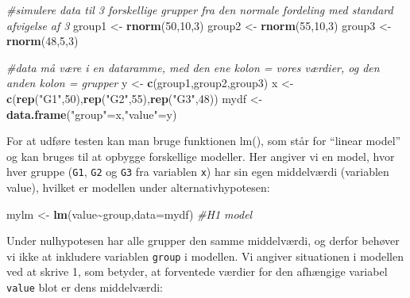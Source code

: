 \documentclass[
]{book}
\newenvironment{Shaded}{\begin{snugshade}}{\end{snugshade}}
\newcommand{\AttributeTok}[1]{\textcolor[rgb]{0.13,0.29,0.53}{#1}}
\newcommand{\CommentTok}[1]{\textcolor[rgb]{0.56,0.35,0.01}{\textit{#1}}}
\newcommand{\DecValTok}[1]{\textcolor[rgb]{0.00,0.00,0.81}{#1}}
\newcommand{\FunctionTok}[1]{\textcolor[rgb]{0.13,0.29,0.53}{\textbf{#1}}}
\newcommand{\NormalTok}[1]{#1}
\newcommand{\OtherTok}[1]{\textcolor[rgb]{0.56,0.35,0.01}{#1}}
\newcommand{\SpecialCharTok}[1]{\textcolor[rgb]{0.81,0.36,0.00}{\textbf{#1}}}
\newcommand{\StringTok}[1]{\textcolor[rgb]{0.31,0.60,0.02}{#1}}
\begin{document}
\begin{Shaded}
\begin{Highlighting}[]
\CommentTok{\#simulere data til 3 forskellige grupper fra den normale fordeling med standard afvigelse af 3}
\NormalTok{group1 }\OtherTok{\textless{}{-}} \FunctionTok{rnorm}\NormalTok{(}\DecValTok{50}\NormalTok{,}\DecValTok{10}\NormalTok{,}\DecValTok{3}\NormalTok{)}
\NormalTok{group2 }\OtherTok{\textless{}{-}} \FunctionTok{rnorm}\NormalTok{(}\DecValTok{55}\NormalTok{,}\DecValTok{10}\NormalTok{,}\DecValTok{3}\NormalTok{)}
\NormalTok{group3 }\OtherTok{\textless{}{-}} \FunctionTok{rnorm}\NormalTok{(}\DecValTok{48}\NormalTok{,}\DecValTok{5}\NormalTok{,}\DecValTok{3}\NormalTok{)}

\CommentTok{\#data må være i en dataramme, med den ene kolon = vores værdier, og den anden kolon = grupper}
\NormalTok{y }\OtherTok{\textless{}{-}} \FunctionTok{c}\NormalTok{(group1,group2,group3)}
\NormalTok{x }\OtherTok{\textless{}{-}} \FunctionTok{c}\NormalTok{(}\FunctionTok{rep}\NormalTok{(}\StringTok{"G1"}\NormalTok{,}\DecValTok{50}\NormalTok{),}\FunctionTok{rep}\NormalTok{(}\StringTok{"G2"}\NormalTok{,}\DecValTok{55}\NormalTok{),}\FunctionTok{rep}\NormalTok{(}\StringTok{"G3"}\NormalTok{,}\DecValTok{48}\NormalTok{))}
\NormalTok{mydf }\OtherTok{\textless{}{-}} \FunctionTok{data.frame}\NormalTok{(}\StringTok{"group"}\OtherTok{=}\NormalTok{x,}\StringTok{"value"}\OtherTok{=}\NormalTok{y)}
\end{Highlighting}
\end{Shaded}

For at udføre testen kan man bruge funktionen lm(), som står for ``linear model'' og kan bruges til at opbygge forskellige modeller. Her angiver vi en model, hvor hver gruppe (\texttt{G1}, \texttt{G2} og \texttt{G3} fra variablen \texttt{x}) har sin egen middelværdi (variablen value), hvilket er modellen under alternativhypotesen:

\begin{Shaded}
\begin{Highlighting}[]
\NormalTok{mylm }\OtherTok{\textless{}{-}} \FunctionTok{lm}\NormalTok{(value}\SpecialCharTok{\textasciitilde{}}\NormalTok{group,}\AttributeTok{data=}\NormalTok{mydf) }\CommentTok{\#H1 model}
\end{Highlighting}
\end{Shaded}

Under nulhypotesen har alle grupper den samme middelværdi, og derfor behøver vi ikke at inkludere variablen \texttt{group} i modellen. Vi angiver situationen i modellen ved at skrive 1, som betyder, at forventede værdier for den afhængige variabel \texttt{value} blot er dens middelværdi:
\end{document}
